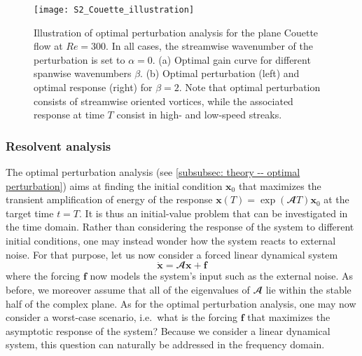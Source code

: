       \begin{figure}[b]
        \centering
        \texttt{[image: S2\_Couette\_illustration]}
        \caption{Illustration of optimal perturbation analysis for the plane Couette flow at $Re=300$. In all cases, the streamwise wavenumber of the perturbation is set to $\alpha=0$. (a) Optimal gain curve for different spanwise wavenumbers $\beta$. (b) Optimal perturbation (left) and optimal response (right) for $\beta=2$. Note that optimal perturbation consists of streamwise oriented vortices, while the associated response at time $T$ consist in high- and low-speed streaks.}
        \label{fig: theory -- optimal perturbation illustration}
      \end{figure}

    \subsubsection{Resolvent analysis}
    \label{subsubsec: theory -- resolvent perturbation}

    The optimal perturbation analysis (see \textsection \ref{subsubsec: theory -- optimal perturbation}) aims at finding the initial condition $\mathbf{x}_0$ that maximizes the transient amplification of energy of the response $\mathbf{x}(T) = \exp \left( \mathbfcal{A} T \right) \mathbf{x}_0$ at the target time $t=T$. It is thus an initial-value problem that can be investigated in the time domain. Rather than considering the response of the system to different initial conditions, one may instead wonder how the system reacts to external noise. For that purpose, let us now consider a forced linear dynamical system
    \begin{equation}
      \dot{\mathbf{x}} = \mathbfcal{A} \mathbf{x} + \mathbf{f}
      \label{eq: theory -- forced linear system}
    \end{equation}
    where the forcing $\mathbf{f}$ now models the system's input such as the external noise. As before, we moreover assume that all of the eigenvalues of $\mathbfcal{A}$ lie within the stable half of the complex plane. As for the optimal perturbation analysis, one may now consider a worst-case scenario, i.e.\ what is the forcing $\mathbf{f}$ that maximizes the asymptotic response of the system? Because we consider a linear dynamical system, this question can naturally be addressed in the frequency domain.

